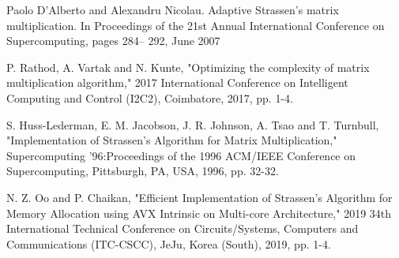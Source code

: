 \documentclass[journal]{IEEEtran}
\begin{document}
\begin{thebibliography}{100}

 Paolo D’Alberto and Alexandru Nicolau. Adaptive Strassen’s matrix multiplication. In Proceedings of the 21st Annual International Conference on Supercomputing, pages 284– 292, June 2007

 P. Rathod, A. Vartak and N. Kunte, "Optimizing the complexity of matrix multiplication algorithm," 2017 International Conference on Intelligent Computing and Control (I2C2), Coimbatore, 2017, pp. 1-4.

 S. Huss-Lederman, E. M. Jacobson, J. R. Johnson, A. Tsao and T. Turnbull, "Implementation of Strassen's Algorithm for Matrix Multiplication," Supercomputing '96:Proceedings of the 1996 ACM/IEEE Conference on Supercomputing, Pittsburgh, PA, USA, 1996, pp. 32-32.

 N. Z. Oo and P. Chaikan, "Efficient Implementation of Strassen's Algorithm for Memory Allocation using AVX Intrinsic on Multi-core Architecture," 2019 34th International Technical Conference on Circuits/Systems, Computers and Communications (ITC-CSCC), JeJu, Korea (South), 2019, pp. 1-4.

\end{thebibliography}
\end{document}
